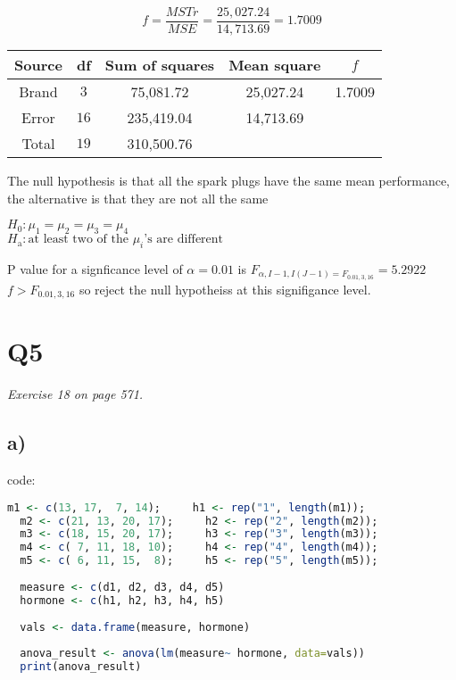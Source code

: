 \documentclass[a4paper,11pt]{article}
\begin{document}
\[f = \frac{MSTr}{MSE} = \frac{25,027.24}{14,713.69} = 1.7009\]

\vspace{1cm}

\begin{center}
  \begin{tabular}{ c c c c c }
    \hline
    \textbf{Source}  & \textbf{df}  & \textbf{Sum of squares} & \textbf{Mean square}  & \textbf{$f$} \\ 
    \hline
    Brand            & $3$          & 75,081.72               & 25,027.24             & 1.7009 \\  
    Error            & $16$         & 235,419.04              & 14,713.69 \\
    Total            & $19$         & 310,500.76 \\
    \hline
  \end{tabular}
\end{center}
\vspace{1cm}

The null hypothesis is that all the spark plugs have the same mean performance, the alternative is that they are
not all the same

$H_0: \mu_1 = \mu_2 = \mu_3 = \mu_4 $\\
$H_\text{a}: \text{at least two of the $\mu_i$'s are different}$

P value for a signficance level of $\alpha = 0.01$ is $F_{\alpha,I-1,I(J-1) = F_{0.01,3,16}} = 5.2922$\\

$f > F_{0.01,3,16}$ so reject the null hypotheiss at this signifigance level.

\section*{Q5}
\textit{Exercise 18 on page 571.}

\subsection*{a)}

code:
\begin{lstlisting}[language=R]
  m1 <- c(13, 17,  7, 14);     h1 <- rep("1", length(m1));
  m2 <- c(21, 13, 20, 17);     h2 <- rep("2", length(m2));
  m3 <- c(18, 15, 20, 17);     h3 <- rep("3", length(m3));
  m4 <- c( 7, 11, 18, 10);     h4 <- rep("4", length(m4));
  m5 <- c( 6, 11, 15,  8);     h5 <- rep("5", length(m5));
  
  measure <- c(d1, d2, d3, d4, d5)
  hormone <- c(h1, h2, h3, h4, h5)
  
  vals <- data.frame(measure, hormone)
  
  anova_result <- anova(lm(measure~ hormone, data=vals))
  print(anova_result)
\end{lstlisting}
\vspace{0.5cm}
\end{document}
